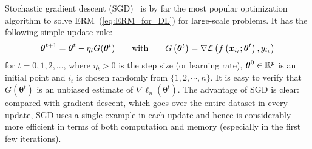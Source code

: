 Stochastic gradient descent (SGD)~\citep{robbins1951stochastic} is by far the most popular optimization algorithm to solve ERM~(\ref{eq:ERM_for_DL})
for large-scale problems. It has the following simple update rule:
\begin{equation}
\text{\boldmath $\theta$}^{t+1}=\text{\boldmath $\theta$}^{t}-\eta_{t}G(\bm{\theta}^{t})\qquad\text{with}\qquad G\left(\bm{\theta}^{t}\right)=\nabla\mathcal{L}\left(f\left(\bm{x}_{i_{t}};\text{\boldmath $\theta$}^{t}\right),y_{i_{t}}\right)\label{eq:SGD_DL}
\end{equation}
for $t=0,1,2,\ldots$, where $\eta_{t}>0$ is the step size (or learning rate), $\text{\boldmath $\theta$}^{0}\in\mathbb{R}^{p}$ is an initial point and $i_{t}$ is chosen randomly from $\{1,2,\cdots, n\}$. It is easy to verify that $G(\bm{\theta}^{t})$ is an unbiased estimate of $\nabla\ell_{n}(\bm{\theta}^{t})$.
The advantage of SGD is clear: compared with gradient descent, which goes over the entire dataset in every update, SGD uses a single example in each update and hence is considerably more efficient in terms of both computation and memory (especially in the first few iterations).

